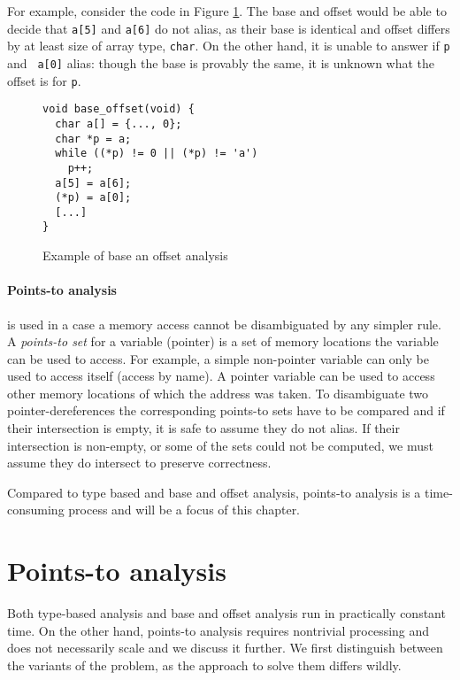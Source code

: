 For example, consider the code in Figure \ref{figure-base-offset-example}. The
base and offset would be able to decide  that {\tt a[5]} and {\tt a[6]} do not
alias, as their base is identical and offset differs by at least size of array
type, {\tt char}. On the other hand, it is unable to answer if {\tt *p} and {\tt
a[0]} alias: though the base is provably the same, it is unknown what the offset
is for {\tt p}.

\begin{figure}[!ht]
\begin{tcolorbox}
\begin{verbatim}
void base_offset(void) {
  char a[] = {..., 0};
  char *p = a;
  while ((*p) != 0 || (*p) != 'a') 
    p++;
  a[5] = a[6];
  (*p) = a[0];
  [...]
}
\end{verbatim}
\end{tcolorbox}
\caption{Example of base an offset analysis}
\label{figure-base-offset-example}
\end{figure}

\paragraph{Points-to analysis} is used in a case a memory access cannot be
disambiguated by any simpler rule. A {\it points-to set} for a variable (pointer) is a set of memory
locations the variable can be used to access. For example, a simple non-pointer
variable can only be used to access itself (access by name).  A pointer variable
can be used to access other memory locations of which the address was taken.
To disambiguate two pointer-dereferences the corresponding points-to sets have
to be compared and if their intersection is empty, it is safe to assume they do
not alias. If their intersection is non-empty, or some of the sets could not be
computed, we must assume they do intersect to preserve correctness.

Compared to type based and base and offset analysis, points-to analysis is a
time-consuming process and will be a focus of this chapter.


\section{Points-to analysis}

Both type-based analysis and base and offset analysis run in practically
constant time. On the other hand, points-to analysis requires nontrivial
processing and does not necessarily scale and we discuss it further. 
We first distinguish between the variants of the problem, as
the approach to solve them differs wildly. 

